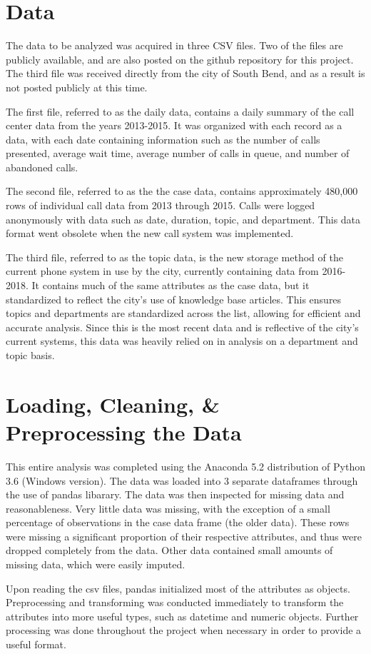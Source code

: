 \documentclass[11pt,twocolumn]{article}
\begin{document}
\section{Data}
The data to be analyzed was acquired in three CSV files.  Two of the files are publicly available, and are also posted on the github repository for this project.  The third file was received directly from the city of South Bend, and as a result is not posted publicly at this time.
\par
The first file, referred to as the daily data, contains a daily summary of the call center data from the years 2013-2015.  It was organized with each record as a data, with each date containing information such as the number of calls presented, average wait time, average number of calls in queue, and number of abandoned calls.
\par
The second file, referred to as the the case data, contains approximately 480,000 rows of individual call data from 2013 through 2015.  Calls were logged anonymously with data such as date, duration, topic, and department.  This data format went obsolete when the new call system was implemented.
\par
The third file, referred to as the topic data, is the new storage method of the current phone system in use by the city, currently containing data from 2016-2018.  It contains much of the same attributes as the case data, but it standardized to reflect the city's use of knowledge base articles.  This ensures topics and departments are standardized across the list, allowing for efficient and accurate analysis.  Since this is the most recent data and is reflective of the city's current systems, this data was heavily relied on in analysis on a department and topic basis.

\section{Loading, Cleaning, \& Preprocessing the Data}
This entire analysis was completed using the Anaconda 5.2 distribution of Python 3.6 (Windows version).  The data was loaded into 3 separate dataframes through the use of pandas libarary.  The data was then inspected for missing data and reasonableness.  Very little data was missing, with the exception of a small percentage of observations in the case data frame (the older data).  These rows were missing a significant proportion of their respective attributes, and thus were dropped completely from the data.  Other data contained small amounts of missing data, which were easily imputed.
\par
Upon reading the csv files, pandas initialized most of the attributes as objects.  Preprocessing and transforming was conducted immediately to transform the attributes into more useful types, such as datetime and numeric objects.  Further processing was done throughout the project when necessary in order to provide a useful format.
\end{document}
